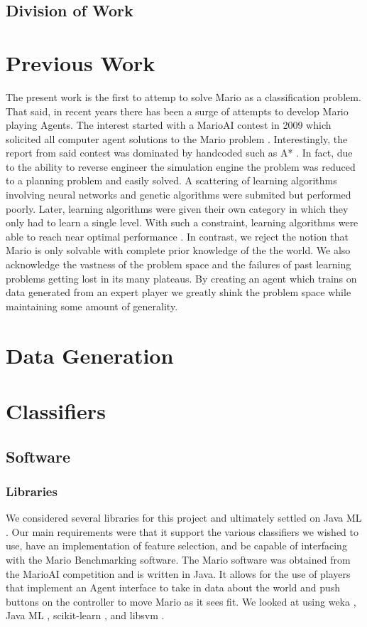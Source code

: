 \documentclass[]{article}   %
\begin{document}
\subsection{Division of Work}

\section{Previous Work}
\label{sec:prevwork}
The present work is the first to attemp to solve Mario as a classification problem.  That said, in recent years there has been a surge of attempts to develop Mario playing Agents.  The interest started with a MarioAI contest in 2009 which solicited all computer agent solutions to the Mario problem \cite{2}.  Interestingly, the report from said contest was dominated by handcoded such as A* \cite{3}.  In fact, due to the ability to reverse engineer the simulation engine the problem was reduced to a planning problem and easily solved.  A scattering of learning algorithms involving neural networks and genetic algorithms were submited but performed poorly.  Later, learning algorithms were given their own category in which they only had to learn a single level. With such a constraint, learning algorithms were able to reach near optimal performance \cite{me}. In contrast, we reject the notion that Mario is only solvable with complete prior knowledge of the the world.  We also acknowledge the vastness of the problem space and the failures of past learning problems getting lost in its many plateaus.  By creating an agent which trains on data generated from an expert player we greatly shink the problem space while maintaining some amount of generality.  



\section{Data Generation}     %
\label{sec:datagen}

\section{Classifiers}
\subsection{Software}
\subsubsection{Libraries}
We considered several libraries for this project and ultimately settled on Java ML \cite{javaml}. Our main requirements were that it support the various classifiers we wished to use, have an implementation of feature selection, and be capable of interfacing with the Mario Benchmarking \cite{mariobenchmark} software. The Mario software was obtained from the MarioAI competition and is written in Java. It allows for the use of players that implement an Agent interface to take in data about the world and push buttons on the controller to move Mario as it sees fit. We looked at using weka \cite{weka}, Java ML \cite{javaml}, scikit-learn \cite{scikit}, and libsvm \cite{libsvm}. 
\end{document}
